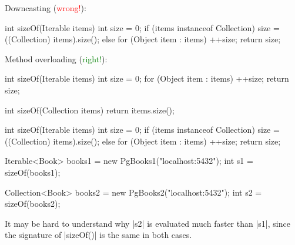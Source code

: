 \documentclass{article}
\begin{document}

\pptToc


\begin{pptWide}{2}
Downcasting (\textcolor{red}{wrong!}):\par
{\small\begin{ffcode}
int sizeOf(Iterable items) {
  int size = 0;
  if (items instanceof Collection) {
    size = ((Collection) items).size();
  } else {
    for (Object item : items) {
      ++size;
    }
  }
  return size;
}
\end{ffcode}
}
\par\columnbreak\par
Method overloading (\textcolor{green}{right!}):\par
{\small\begin{ffcode}
int sizeOf(Iterable items) {
  int size = 0;
  for (Object item : items) {
    ++size;
  }
  return size;
}

int sizeOf(Collection items) {
  return items.size();
}
\end{ffcode}
}
\end{pptWide}
\par
\plush{}

\begin{pptWide}{2}
{\small\begin{ffcode}
int sizeOf(Iterable items) {
  int size = 0;
  if (items instanceof Collection) {
    size = ((Collection) items).size();
  } else {
    for (Object item : items) {
      ++size;
    }
  }
  return size;
}
\end{ffcode}
}
\par\columnbreak\par
{\small\begin{ffcode}
Iterable<Book> books1 =
  new PgBooks1("localhost:5432");
int s1 = sizeOf(books1);

Collection<Book> books2 =
  new PgBooks2("localhost:5432");
int s2 = sizeOf(books2);
\end{ffcode}
}
\end{pptWide}
\par
It may be hard to understand why |s2| is evaluated much faster than |s1|, since the signature of |sizeOf()| is the same in both cases.
\plush{}
\end{document}

